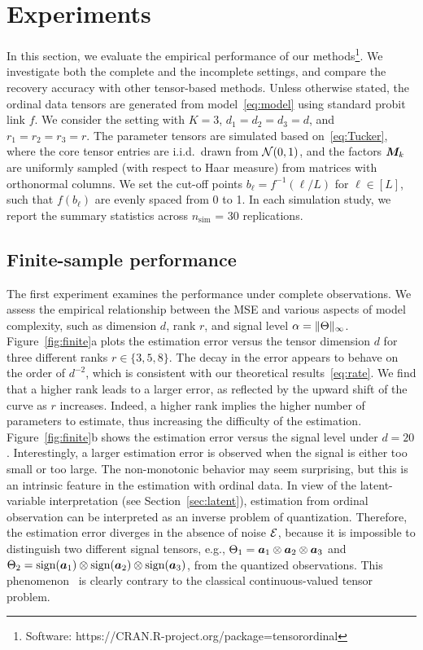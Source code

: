 \documentclass{article}
\theoremstyle{plain}
\theoremstyle{definition}
\begin{document}
\section{Experiments}\label{sec:experiment}
In this section, we evaluate the empirical performance of our methods\footnote{Software:  https://CRAN.R-project.org/package=tensorordinal}. We investigate both the complete and the incomplete settings, and compare the recovery accuracy with other tensor-based methods. Unless otherwise stated, the ordinal data tensors are generated from model~\eqref{eq:model} using standard probit link $f$. We consider the setting with $K=3$, $d_1=d_2=d_3=d$, and $r_1=r_2=r_3=r$. The parameter tensors are simulated based on~\eqref{eq:Tucker}, where the core tensor entries are i.i.d.\ drawn from $\mathcal{N}(0,1)$, and the factors $\bm M_k$ are uniformly sampled (with respect to Haar measure) from matrices with orthonormal columns. We set the cut-off points $b_\ell=f^{-1}(\ell/L)$ for $\ell\in[L]$, such that $f(b_\ell)$ are evenly spaced from 0 to 1. In each simulation study, we report the summary statistics across $n_{\text{sim}}$ = 30 replications. 


\subsection{Finite-sample performance}\label{sec:simulation}
The first experiment examines the performance under complete observations. We assess the empirical relationship between the MSE and various aspects of model complexity, such as dimension $d$, rank $r$, and signal level $\alpha=\lVert\Theta\rVert_\infty$. Figure~\ref{fig:finite}a plots the estimation error versus the tensor dimension $d$ for three different ranks $r\in\{3,5,8\}$. The decay in the error appears to behave on the order of $d^{-2}$, which is consistent with our theoretical results~\eqref{eq:rate}. We find that a higher rank leads to a larger error, as reflected by the upward shift of the curve as $r$ increases. Indeed, a higher rank implies the higher number of parameters to estimate, thus increasing the difficulty of the estimation. Figure~\ref{fig:finite}b shows the estimation error versus the signal level under $d=20$. Interestingly, a larger estimation error is observed when the signal is either too small or too large. The non-monotonic behavior may seem surprising, but this is an intrinsic feature in the estimation with ordinal data. In view of the latent-variable interpretation (see Section~\ref{sec:latent}), estimation from ordinal observation can be interpreted as an inverse problem of quantization. Therefore, the estimation error diverges in the absence of noise $\mathcal{E}$, because it is impossible to distinguish two different signal tensors, e.g., $\Theta_1=\bm{a}_1\otimes \bm{a}_2\otimes \bm{a}_3$ and $\Theta_2=\text{sign}(\bm{a}_1)\otimes \text{sign}(\bm{a}_2)\otimes \text{sign}(\bm{a}_3)$, from the quantized observations. This phenomenon~\cite{davenport2014,sur2019modern} is clearly contrary to the classical continuous-valued tensor problem.
\end{document}
